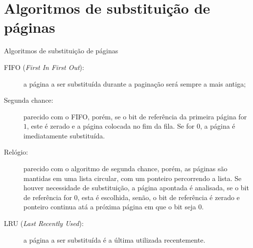 





\section*{Algoritmos de substituição de páginas}

\begin{frame}{Algoritmos de substituição de páginas}
\begin{description}
\item[FIFO ({\em First In First Out}):] a página a ser substituída
  durante a paginação será sempre a mais antiga;
\pause\item[Segunda chance:] parecido com o FIFO, porém, se o bit de
  referência da primeira página for $1$, este é zerado e a página
  colocada no fim da fila. Se for $0$, a página é imediatamente
  substituída.
\pause\item[Relógio:] parecido com o algoritmo de segunda chance, porém, as
  páginas são mantidas em uma lista circular, com um ponteiro
  percorrendo a lista. Se houver necessidade de substituição, a página
  apontada é analisada, se o bit de referência for $0$, esta é
  escolhida, senão, o bit de referência é zerado e ponteiro continua
  atá a próxima página em que o bit seja $0$.
\pause\item [LRU ({\em Last Recently Used}):] a página a ser substituída é a
  última utilizada recentemente.
\end{description}
\end{frame}



